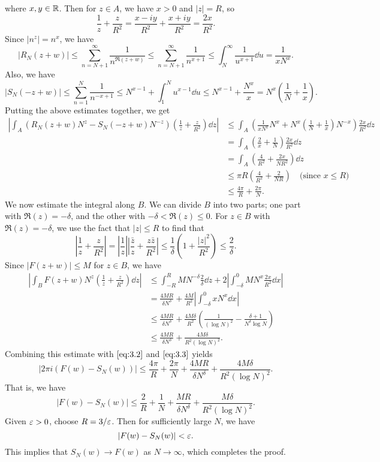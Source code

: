 \begin{pf}
where $x, y \in \mathbb{R}$. Then for $z \in A$, we have $x > 0$ and $|z| = R$, so 
\[ \frac1z + \frac z{R^2} = \frac{x-iy}{R^2} + \frac{x + iy}{R^2} = \frac{2x}{R^2}. \]
Since $|n^z| = n^x$, we have 
\[ |R_N(z+w)| \leq \sum_{n=N+1}^\infty \frac{1}{n^{\Re(z+w)}} \leq \sum_{n=N+1}^\infty 
\frac{1}{n^{x+1}} \leq \int_N^\infty \frac{1}{u^{x+1}}\dd u = \frac{1}{xN^x}. \]
Also, we have 
\[ |S_N(-z+w)| \leq \sum_{n=1}^N \frac{1}{n^{-x+1}} \leq N^{x-1} + \int_1^N u^{x-1}\dd u 
\leq N^{x-1} + \frac{N^x}{x} = N^x \left( \frac1N + \frac1x \right). \]
Putting the above estimates together, we get 
\begin{align*}
    \left| \int_A \left( R_N(z+w) N^z - S_N(-z+w) N^{-z} \right) \left( \frac1z + \frac z{R^2} \right) \dd z \right| 
    &\leq \int_A \left( \frac{1}{xN^x} N^x + N^x \left( \frac1N + \frac1x \right) N^{-x} \right) 
    \frac{2x}{R^2}\dd z \\
    &= \int_A \left( \frac2x + \frac1N \right) \frac{2x}{R^2}\dd z \\
    &= \int_A \left( \frac4{R^2} + \frac{2x}{NR^2} \right)\dd z \\
    &\leq \pi R \left( \frac4{R^2} + \frac{2}{NR} \right) \quad \text{(since $x \leq R$)} \\
    &\leq \frac{4\pi}R + \frac{2\pi}N. 
\end{align*}
We now estimate the integral along $B$. We can divide $B$ into two parts; one part with $\Re(z) = 
-\delta$, and the other with $-\delta < \Re(z) \leq 0$. For $z \in B$ with $\Re(z) = -\delta$, 
we use the fact that $|z| \leq R$ to find that 
\[ \left| \frac1z + \frac z{R^2} \right| = \left| \frac1z \right| \left| \frac{\bar z}{z} + 
\frac{z\bar z}{R^2} \right| \leq \frac1\delta \left( 1 + \frac{|z|^2}{R^2} \right) \leq \frac2\delta. \]
Since $|F(z+w)| \leq M$ for $z \in B$, we have 
\begin{align*}
    \left| \int_B F(z+w) N^z \left( \frac1z + \frac z{R^2} \right)\dd z \right| 
    &\leq \int_{-R}^R MN^{-\delta} \frac2\delta\dd z + 2 \left| \int_{-\delta}^0 MN^x \frac{2x}{R^2}\dd x \right| \\
    &= \frac{4MR}{\delta N^\delta} + \frac{4M}{R^2} \left| \int_{-\delta}^0 xN^x \dd x \right| \\
    &\leq \frac{4MR}{\delta N^\delta} + \frac{4M\delta}{R^2} \left( \frac1{(\log N)^2} - \frac{\delta+1}{N^\delta \log N} \right) \\
    &\leq \frac{4MR}{\delta N^\delta} + \frac{4M\delta}{R^2(\log N)^2}. 
\end{align*}
Combining this estimate with $\eqref{eq:3.2}$ and $\eqref{eq:3.3}$ yields 
\[ |2\pi i(F(w) - S_N(w))| \leq \frac{4\pi}R + \frac{2\pi}N + \frac{4MR}{\delta N^\delta} 
+ \frac{4M\delta}{R^2(\log N)^2}. \] 
That is, we have 
\[ |F(w) - S_N(w)| \leq \frac2R + \frac1N + \frac{MR}{\delta N^\delta} + \frac{M\delta}{R^2(\log N)^2}. \]
Given $\varepsilon > 0$, choose $R = 3/\varepsilon$. Then for sufficiently large $N$, we have 
\[ |F(w) - S_N(w)| < \varepsilon. \]
This implies that $S_N(w) \to F(w)$ as $N \to \infty$, which completes the proof. 
\end{pf}

